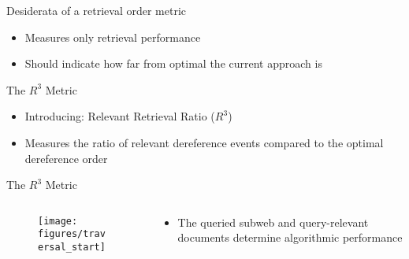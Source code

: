 \begin{frame}{Desiderata of a retrieval order metric}
    \begin{itemize}
        \item Measures only retrieval performance
        \item Should indicate how far from optimal the current approach is
    \end{itemize}
\end{frame}

\begin{frame}{The $ R^{3} $ Metric}
    \begin{itemize}
        \item Introducing: Relevant Retrieval Ratio ($ R^{3} $)
        \item Measures the ratio of relevant dereference events compared to the optimal dereference order
    \end{itemize}
\end{frame}

\begin{frame}{The $ R^{3} $ Metric}
    \begin{columns}[T] %
        \begin{column}{.48\textwidth}

       \begin{figure}
            \centering
            \texttt{[image: figures/traversal\_start]}
        \end{figure}

        \end{column}%
        \hfill%
        \begin{column}{.48\textwidth}
            \bigskip
            \begin{itemize}
                \item The queried subweb and query-relevant documents determine algorithmic performance
            \end{itemize}
        \end{column}%
    \end{columns}
\end{frame}

